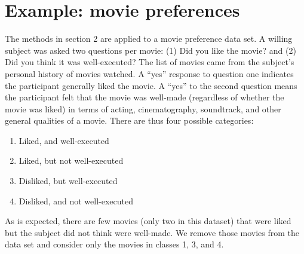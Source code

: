 \section{Example: movie preferences}

The methods in section 2 are applied to a movie preference data set. A willing subject was asked two questions per movie: (1) Did you like the movie? and (2) Did you think it was well-executed? The list of movies came from the subject's personal history of movies watched. A ``yes'' response to question one indicates the participant generally liked the movie. A ``yes'' to the second question means the participant felt that the movie was well-made (regardless of whether the movie was liked) in terms of acting, cinematography, soundtrack, and other general qualities of a movie. There are thus four possible categories:
\begin{enumerate}
\item Liked, and well-executed
\item Liked, but not well-executed
\item Disliked, but well-executed
\item Disliked, and not well-executed
\end{enumerate}
As is expected, there are few movies (only two in this dataset) that were liked but the subject did not think were well-made. We remove those movies from the data set and consider only the movies in classes 1, 3, and 4.

